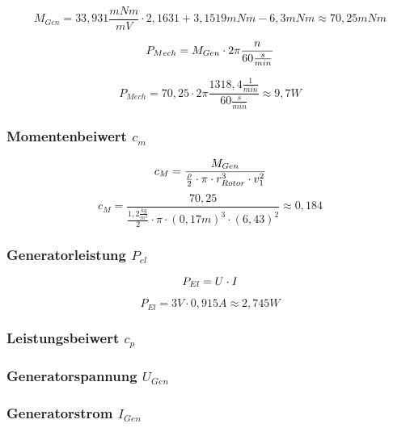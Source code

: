 $$M_{Gen} = 33,931\frac{mNm}{mV} \cdot 2,1631 + 3,1519 mNm - 6,3mNm \approx 70,25 mNm$$

\begin{equation}
    \centering
    P_{Mech} = M_{Gen} \cdot 2 \pi \frac{n}{60\frac{s}{min}}
    \label{eq:230615_Mechanischeleistung}
\end{equation}

$$P_{Mech} = 70,25 \cdot 2 \pi \frac{1318,4 \frac{1}{min}}{60\frac{s}{min}} \approx 9,7W$$

\subsubsection*{Momentenbeiwert $c_m$}
\begin{equation}
    \centering
    c_M = \frac{M_{Gen}}{ \frac{\rho}{2} \cdot \pi \cdot r_{Rotor}^3 \cdot v_1^2}
    \label{eq:230615_Momentenbeiwert}
\end{equation}
$$c_M = \frac{70,25}{ \frac{1,2 \frac{kg}{m^3}}{2} \cdot \pi \cdot (0,17 m)^3 \cdot (6,43)^2}\approx 0,184$$

\subsubsection*{Generatorleistung $P_{el}$}
\begin{equation}
    \centering
    P_{El} = U \cdot I
    \label{eq:230615_Elektrische_Leistung}
\end{equation}

$$P_{El} = 3V \cdot 0,915A \approx 2,745W$$


\subsubsection*{Leistungsbeiwert $c_p$}


\subsubsection*{Generatorspannung $U_{Gen}$}

\subsubsection*{Generatorstrom $I_{Gen}$}

